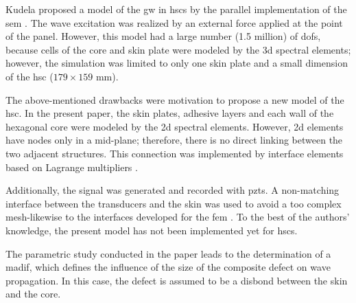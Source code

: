 Kudela proposed a model of the \ac{gw} in \acp{hsc} by the parallel implementation of the \ac{sem} \cite{kudela2016parallel}.
The wave excitation was realized by an external force applied at the point of the panel.
However, this model had a large number (1.5 million) of \acp{dof}, because cells of the core and skin plate were modeled by the \ac{3d} spectral elements; however, the simulation was limited to only one skin plate and a small dimension of the \ac{hsc} (\(179 \times 159 \) mm).

The above-mentioned drawbacks were motivation to propose a new model of the \ac{hsc}.
In the present paper, the skin plates, adhesive layers and each wall of the hexagonal core were modeled by the \ac{2d} spectral elements.
However, \ac{2d} elements have nodes only in a mid-plane; therefore, there is no direct linking between the two adjacent structures.
This connection was implemented by interface elements based on Lagrange multipliers \cite{ashwin2014formulation, fiborek20192d}.

Additionally, the signal was generated and recorded with \acp{pzt}.
A non-matching interface between the transducers and the skin was used to avoid a too complex mesh-likewise to the interfaces developed for the \ac{fem} \cite{flemisch2000elasto, flemisch2012non}. 
To the best of the authors’ knowledge, the present model has not been implemented yet for \acp{hsc}.

The parametric study conducted in the paper leads to the determination of a \ac{madif}, which defines the influence of the size of the composite defect on wave propagation.
In this case, the defect is assumed to be a disbond between the skin and the core.
